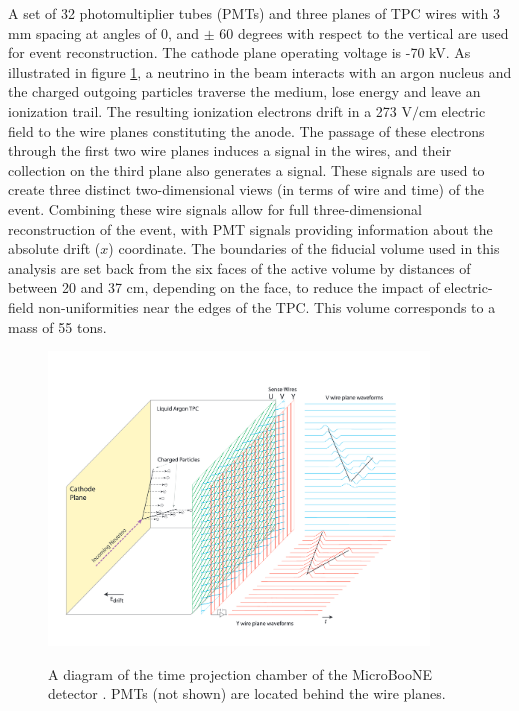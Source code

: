 \documentclass[a4paper,11pt]{article}
\begin{document}
A set of 32 photomultiplier tubes (PMTs) and three planes of TPC wires with 3 mm spacing at angles of 0, and $\pm$ 60 degrees with respect to the vertical are used for event reconstruction. The cathode plane operating voltage is -70 kV. As illustrated in figure \ref{detector_fig}, a neutrino in the beam interacts with an argon nucleus and the charged outgoing particles traverse the medium, lose energy and leave an ionization trail. The resulting ionization electrons drift in a 273 $\text{V/cm}$ electric field to the wire planes constituting the anode. The passage of these electrons through the first two wire planes induces a signal in the wires, and their collection on the third plane also generates a signal. These signals are used to create three distinct two-dimensional views (in terms of wire and time) of the event. Combining these wire signals allow for full three-dimensional reconstruction of the event, with PMT signals providing information about the absolute drift ($x$) coordinate. The boundaries of the fiducial volume used in this analysis are set back from the six faces of the active volume by distances of between 20 and 37 cm, depending on the face, to reduce the impact of electric-field non-uniformities near the edges of the TPC. This volume corresponds to a mass of 55 tons.\\

\begin{figure}[ht!]
\centering
	\includegraphics[width=0.9\textwidth]{Figures/static_figs/detector2.png} \\
\caption{A diagram of the time projection chamber of the MicroBooNE detector \cite{ub_detectorpaper}. PMTs (not shown) are located behind the wire planes.}\label{detector_fig}
\end{figure}
\end{document}
